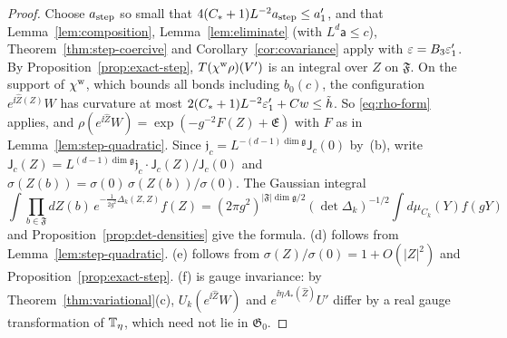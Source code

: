 \begin{proof}
Choose $a_{\rm step}$ so small that $4(C_*+1)L^{-2}a_{\rm step}\le a'_1$, and that Lemma~\ref{lem:composition}, Lemma~\ref{lem:eliminate} (with $L^d\mathsf a\le c$), Theorem~\ref{thm:step-coercive} and Corollary~\ref{cor:covariance} apply with $\varepsilon=B_3\varepsilon'_1$. By Proposition~\ref{prop:exact-step}, $T(\chi^{\rm w}\rho)(V')$ is an integral over $Z$ on $\mathfrak F$. On the support of $\chi^{\rm w}$, which bounds all bonds including $b_0(c)$, the configuration $e^{\ii\hat Z(Z)}W$ has curvature at most $2(C_*+1)L^{-2}\varepsilon'_1+Cw\le\tilde h$. So \eqref{eq:rho-form} applies, and $\rho(e^{\ii\hat Z}W)=\exp(-g^{-2}F(Z)+\mathfrak E)$ with $F$ as in Lemma~\ref{lem:step-quadratic}. Since $\mathfrak j_c=L^{-(d-1)\dim\mathfrak g}\mathsf J_c(0)$ by~(b), write $\mathsf J_c(Z)=L^{(d-1)\dim\mathfrak g}\mathfrak j_c\cdot\mathsf J_c(Z)/\mathsf J_c(0)$ and $\sigma(Z(b))=\sigma(0)\,\sigma(Z(b))/\sigma(0)$. The Gaussian integral
\[
\int\prod_{b\in\mathfrak F}dZ(b)\,e^{-\frac1{2g^2}\Delta_k(Z,Z)}f(Z)=(2\pi g^2)^{|\mathfrak F|\dim\mathfrak g/2}(\det\Delta_k)^{-1/2}\int d\mu_{C_k}(Y)f(gY)
\]
and Proposition~\ref{prop:det-densities} give the formula. (d) follows from Lemma~\ref{lem:step-quadratic}. (e) follows from $\sigma(Z)/\sigma(0)=1+O(|Z|^2)$ and Proposition~\ref{prop:exact-step}. (f) is gauge invariance: by Theorem~\ref{thm:variational}(c), $U_k(e^{\ii\hat Z}W)$ and $e^{\ii\eta A_*(\hat Z)}U'$ differ by a real gauge transformation of $\mathbb T_\eta$, which need not lie in $\mathfrak G_0$.
\end{proof}

